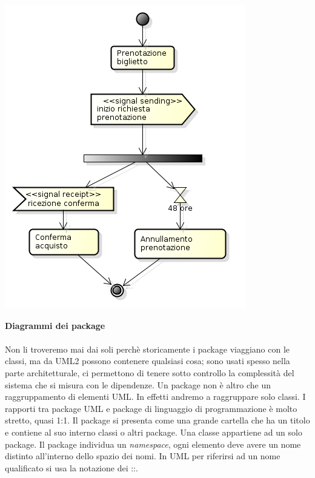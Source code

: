 \begin{center}

\includegraphics[width=0.75\columnwidth]{img1} %

\end{center}

\textbf{Diagrammi dei package}\\\\

Non li troveremo mai dai soli perchè storicamente i package viaggiano con le classi, ma da UML2 possono contenere qualsiasi cosa; sono usati spesso nella parte architetturale, ci permettono di tenere sotto controllo la complessità del sistema che si misura con le dipendenze. Un package non è altro che un raggruppamento di elementi UML. In effetti andremo a raggruppare solo classi. I rapporti tra package UML e package di linguaggio di programmazione è molto stretto, quasi 1:1. Il package si presenta come una grande cartella che ha un titolo e contiene al suo interno classi o altri package. Una classe appartiene ad un solo package. Il package individua un \textit{namespace}, ogni elemento deve avere un nome distinto all'interno dello spazio dei nomi. In UML per riferirsi ad un nome qualificato si usa la notazione dei ::.

